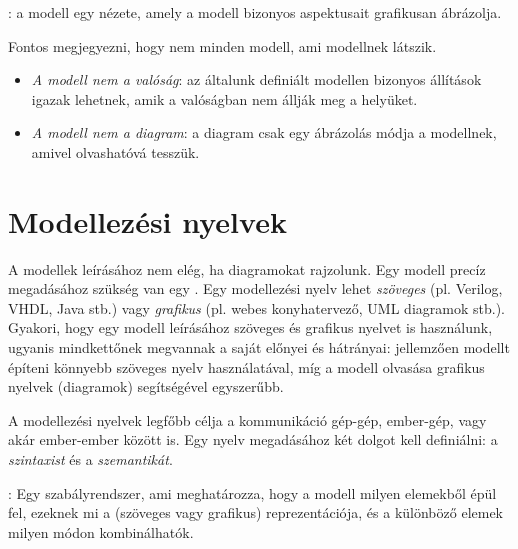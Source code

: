 \begin{definicio}
	: a modell egy nézete, amely a modell bizonyos aspektusait grafikusan ábrázolja.
\end{definicio}

\begin{megjegyzes}
Fontos megjegyezni, hogy nem minden modell, ami modellnek látszik.

\begin{itemize}
	\item \emph{A modell nem a valóság}: az általunk definiált modellen bizonyos állítások igazak lehetnek, amik a valóságban nem állják meg a helyüket.
	\item \emph{A modell nem a diagram}: a diagram csak egy ábrázolás módja a modellnek, amivel olvashatóvá tesszük.
\end{itemize}
\end{megjegyzes}


\section{Modellezési nyelvek}

A modellek leírásához nem elég, ha diagramokat rajzolunk. Egy modell precíz megadásához szükség van egy . Egy modellezési nyelv lehet \emph{szöveges} (pl. Verilog, VHDL, Java stb.) vagy \emph{grafikus} (pl. webes konyhatervező, UML diagramok stb.). Gyakori, hogy egy modell leírásához szöveges és grafikus nyelvet is használunk, ugyanis mindkettőnek megvannak a saját előnyei és hátrányai: jellemzően modellt építeni könnyebb szöveges nyelv használatával, míg a modell olvasása grafikus nyelvek (diagramok) segítségével egyszerűbb.

A modellezési nyelvek legfőbb célja a kommunikáció gép-gép, ember-gép, vagy akár ember-ember között is. Egy nyelv megadásához két dolgot kell definiálni: a \emph{szintaxist} és a \emph{szemantikát}.


\begin{definicio}
	: Egy szabályrendszer, ami meghatározza, hogy a modell milyen elemekből épül fel, ezeknek mi a (szöveges vagy grafikus) reprezentációja, és a különböző elemek milyen módon kombinálhatók.
\end{definicio}

